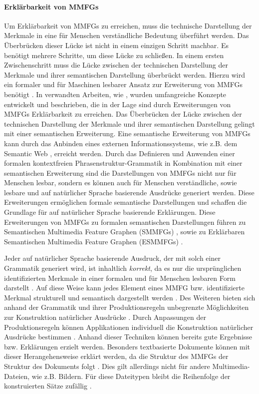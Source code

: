 \paragraph{Erklärbarkeit von MMFGs}
\label{sec2:sota:par:explainability-of-mmfgs}
Um Erklärbarkeit von MMFGs zu erreichen, muss die technische Darstellung der Merkmale in eine für Menschen verständliche Bedeutung überführt werden.
Das Überbrücken dieser Lücke ist nicht in einem einzigen Schritt machbar.
Es benötigt mehrere Schritte, um diese Lücke zu schließen.
In einem ersten Zwischenschritt muss die Lücke zwischen der technischen Darstellung der Merkmale und ihrer semantischen Darstellung überbrückt werden.
Hierzu wird ein formaler und für Maschinen lesbarer Ansatz zur Erweiterung von MMFGs benötigt \cite{towards_auto_sem_expl_mmfg}.
In verwandten Arbeiten, wie \cite{towards_auto_sem_expl_mmfg}, wurden umfangreiche Konzepte entwickelt und beschrieben, die in der Lage sind durch Erweiterungen von MMFGs Erklärbarkeit zu erreichen.
Das Überbrücken der Lücke zwischen der technischen Darstellung der Merkmale und ihrer semantischen Darstellung gelingt mit einer semantischen Erweiterung.
Eine semantische Erweiterung von MMFGs kann durch das Anbinden eines externen Informationssystems, wie z.B. dem Semantic Web \cite{sem-web}, erreicht werden.
Durch das Definieren und Anwenden einer formalen kontextfreien Phrasenstruktur-Grammatik \cite{hausser-ps-grammar} in Kombination mit einer semantischen Erweiterung sind die Darstellungen von MMFGs nicht nur für Menschen lesbar, sondern es können auch für Menschen verständliche, sowie lesbare und auf natürlicher Sprache basierende Ausdrücke generiert werden.
Diese Erweiterungen ermöglichen formale semantische Darstellungen und schaffen die Grundlage für auf natürlicher Sprache basierende Erklärungen.
Diese Erweiterungen von MMFGs zu formalen semantischen Darstellungen führen zu Semantischen Multimedia Feature Graphen (SMMFGs) \cite{towards_auto_sem_expl_mmfg}, sowie zu Erklärbaren Semantischen Multimedia Feature Graphen (ESMMFGs) \cite{towards_auto_sem_expl_mmfg}.

Jeder auf natürlicher Sprache basierende Ausdruck, der mit solch einer Grammatik generiert wird, ist inhaltlich \textit{korrekt}, da es nur die ursprünglichen identifizierten Merkmale in einer formalen und für Menschen lesbaren Form darstellt \cite{towards_auto_sem_expl_mmfg}.
Auf diese Weise kann jedes Element eines MMFG bzw. identifizierte Merkmal strukturell und semantisch dargestellt werden \cite{towards_auto_sem_expl_mmfg}.
Des Weiteren bieten sich anhand der Grammatik und ihrer Produktionsregeln unbegrenzte Möglichkeiten zur Konstruktion natürlicher Ausdrücke \cite{towards_auto_sem_expl_mmfg}.
Durch Anpassungen der Produktionsregeln können Applikationen individuell die Konstruktion natürlicher Ausdrücke bestimmen \cite{towards_auto_sem_expl_mmfg}.
Anhand dieser Techniken können bereits gute Ergebnisse bzw. Erklärungen erzielt werden.
Besonders textbasierte Dokumente können mit dieser Herangehensweise erklärt werden, da die Struktur des MMFGs der Struktur des Dokuments folgt \cite{towards_auto_sem_expl_mmfg}.
Dies gilt allerdings nicht für andere Multimedia-Dateien, wie z.B. Bildern.
Für diese Dateitypen bleibt die Reihenfolge der konstruierten Sätze zufällig \cite{towards_auto_sem_expl_mmfg}.

